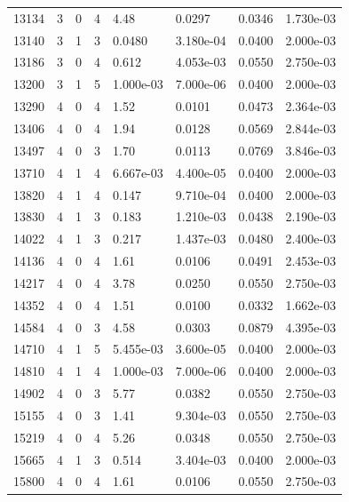 \documentclass[preview]{standalone}
\begin{document}
{{{{\begin{tabular}{L{1.2cm}C{1.2cm} C{0.3cm}C{0.5cm} C{1.4cm}C{1.4cm} C{1.4cm}C{1.4cm}}
  13134  &     3  & 0     &  4 &  4.48  & 0.0297  & 0.0346 &  1.730e-03   \\ 
  13140  &     3  & 1     &  3 &  0.0480  & 3.180e-04  & 0.0400 &  2.000e-03   \\ 
  13186  &     3  & 0     &  4 &  0.612  & 4.053e-03  & 0.0550 &  2.750e-03   \\ 
  13200  &     3  & 1     &  5 &  1.000e-03  & 7.000e-06  & 0.0400 &  2.000e-03   \\ 
  13290  &     4  & 0     &  4 &  1.52  & 0.0101  & 0.0473 &  2.364e-03   \\ 
  13406  &     4  & 0     &  4 &  1.94  & 0.0128  & 0.0569 &  2.844e-03   \\ 
  13497  &     4  & 0     &  3 &  1.70  & 0.0113  & 0.0769 &  3.846e-03   \\ 
  13710  &     4  & 1     &  4 &  6.667e-03  & 4.400e-05  & 0.0400 &  2.000e-03   \\ 
  13820  &     4  & 1     &  4 &  0.147  & 9.710e-04  & 0.0400 &  2.000e-03   \\ 
  13830  &     4  & 1     &  3 &  0.183  & 1.210e-03  & 0.0438 &  2.190e-03   \\ 
  14022  &     4  & 1     &  3 &  0.217  & 1.437e-03  & 0.0480 &  2.400e-03   \\ 
  14136  &     4  & 0     &  4 &  1.61  & 0.0106  & 0.0491 &  2.453e-03   \\ 
  14217  &     4  & 0     &  4 &  3.78  & 0.0250  & 0.0550 &  2.750e-03   \\ 
  14352  &     4  & 0     &  4 &  1.51  & 0.0100  & 0.0332 &  1.662e-03   \\ 
  14584  &     4  & 0     &  3 &  4.58  & 0.0303  & 0.0879 &  4.395e-03   \\ 
  14710  &     4  & 1     &  5 &  5.455e-03  & 3.600e-05  & 0.0400 &  2.000e-03   \\ 
  14810  &     4  & 1     &  4 &  1.000e-03  & 7.000e-06  & 0.0400 &  2.000e-03   \\ 
  14902  &     4  & 0     &  3 &  5.77  & 0.0382  & 0.0550 &  2.750e-03   \\ 
  15155  &     4  & 0     &  3 &  1.41  & 9.304e-03  & 0.0550 &  2.750e-03   \\ 
  15219  &     4  & 0     &  4 &  5.26  & 0.0348  & 0.0550 &  2.750e-03   \\ 
  15665  &     4  & 1     &  3 &  0.514  & 3.404e-03  & 0.0400 &  2.000e-03   \\ 
  15800  &     4  & 0     &  4 &  1.61  & 0.0106  & 0.0550 &  2.750e-03   \\ 

\end{tabular}}}}}
\end{document}
